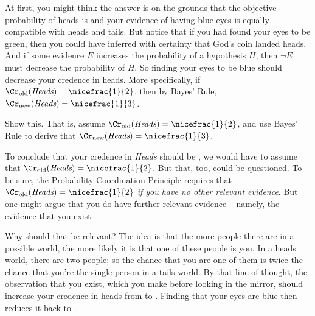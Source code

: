 At first, you might think the answer is  on the grounds
that the objective probability of heads is  and your
evidence of having blue eyes is equally compatible with heads and
tails. But notice that if you had found your eyes to be green, then
you could have inferred with certainty that God's coin landed
heads. And if some evidence $E$ increases the probability of a
hypothesis $H$, then $\neg E$ must decrease the probability of $H$. So
finding your eyes to be blue should decrease your credence in heads.
More specifically, if $\Cr_\text{old}(\emph{Heads}) =
\nicefrac{1}{2}$, then by Bayes' Rule, $\Cr_\text{new}(\emph{Heads}) =
\nicefrac{1}{3}$.

% 

\begin{exercise}{1}
  Show this. That is, assume $\Cr_\text{old}(\emph{Heads}) =
  \nicefrac{1}{2}$, and use Bayes' Rule to derive that $\Cr_\text{new}(\emph{Heads}) =
  \nicefrac{1}{3}$.%
\end{exercise}

To conclude that your credence in \emph{Heads}
should be , we would have to assume that
$\Cr_\text{old}(\emph{Heads}) = \nicefrac{1}{2}$. But that, too, could
be questioned. To be sure, the Probability Coordination Principle
requires that $\Cr_\text{old}(\emph{Heads}) = \nicefrac{1}{2}$
\emph{if you have no other relevant evidence}. But one might argue
that you do have further relevant evidence -- namely, the evidence
that you exist.

Why should that be relevant? The idea is that the more people there
are in a possible world, the more likely it is that one of these
people is you. In a heads world, there are two people; so the chance
that you are one of them is twice the chance that you're the single
person in a tails world. By that line of thought, the observation that
you exist, which you make before looking in the mirror, should
increase your credence in heads from  to
. Finding that your eyes are blue then reduces it back to
.

